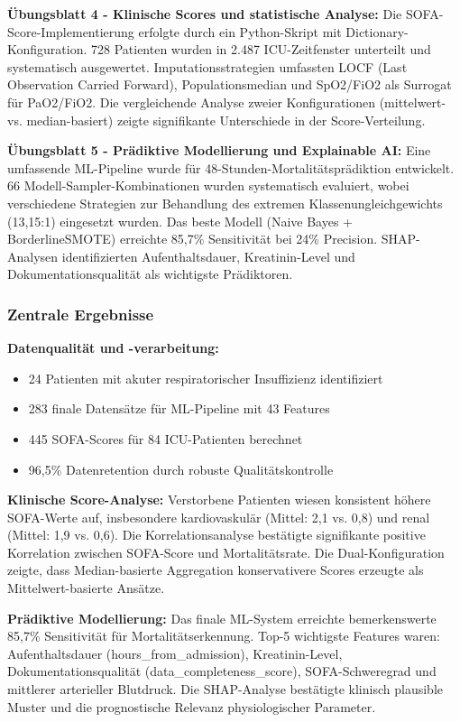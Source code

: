 \documentclass[12pt]{article}
\begin{document}
\textbf{Übungsblatt 4 - Klinische Scores und statistische Analyse:}
Die SOFA-Score-Implementierung erfolgte durch ein Python-Skript mit Dictionary-Konfiguration. 728 Patienten wurden in 2.487 ICU-Zeitfenster unterteilt und systematisch ausgewertet. Imputationsstrategien umfassten LOCF (Last Observation Carried Forward), Populationsmedian und SpO2/FiO2 als Surrogat für PaO2/FiO2. Die vergleichende Analyse zweier Konfigurationen (mittelwert- vs. median-basiert) zeigte signifikante Unterschiede in der Score-Verteilung.

\textbf{Übungsblatt 5 - Prädiktive Modellierung und Explainable AI:}
Eine umfassende ML-Pipeline wurde für 48-Stunden-Mortalitätsprädiktion entwickelt. 66 Modell-Sampler-Kombinationen wurden systematisch evaluiert, wobei verschiedene Strategien zur Behandlung des extremen Klassenungleichgewichts (13,15:1) eingesetzt wurden. Das beste Modell (Naive Bayes + BorderlineSMOTE) erreichte 85,7\% Sensitivität bei 24\% Precision. SHAP-Analysen identifizierten Aufenthaltsdauer, Kreatinin-Level und Dokumentationsqualität als wichtigste Prädiktoren.

\subsubsection{Zentrale Ergebnisse}

\textbf{Datenqualität und -verarbeitung:}
\begin{itemize}
    \item 24 Patienten mit akuter respiratorischer Insuffizienz identifiziert
    \item 283 finale Datensätze für ML-Pipeline mit 43 Features
    \item 445 SOFA-Scores für 84 ICU-Patienten berechnet
    \item 96,5\% Datenretention durch robuste Qualitätskontrolle
\end{itemize}

\textbf{Klinische Score-Analyse:}
Verstorbene Patienten wiesen konsistent höhere SOFA-Werte auf, insbesondere kardiovaskulär (Mittel: 2,1 vs. 0,8) und renal (Mittel: 1,9 vs. 0,6). Die Korrelationsanalyse bestätigte signifikante positive Korrelation zwischen SOFA-Score und Mortalitätsrate. Die Dual-Konfiguration zeigte, dass Median-basierte Aggregation konservativere Scores erzeugte als Mittelwert-basierte Ansätze.

\textbf{Prädiktive Modellierung:}
Das finale ML-System erreichte bemerkenswerte 85,7\% Sensitivität für Mortalitätserkennung. Top-5 wichtigste Features waren: Aufenthaltsdauer (hours\_from\_admission), Kreatinin-Level, Dokumentationsqualität (data\_completeness\_score), SOFA-Schweregrad und mittlerer arterieller Blutdruck. Die SHAP-Analyse bestätigte klinisch plausible Muster und die prognostische Relevanz physiologischer Parameter.
\end{document}
